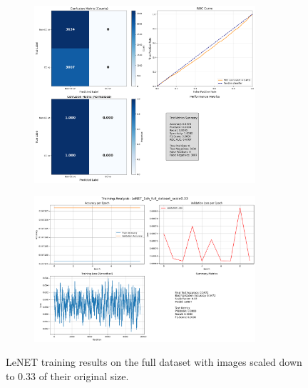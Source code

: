\documentclass{pracalicmgr}
\begin{document}
\begin{figure}[H]
    \centering
    \begin{subfigure}{\textwidth}
        \centering
        \includegraphics[width=0.9\textwidth]{src/LeNET_1ch_full_dataset_scale033.png}
        \label{fig:Lefull33sub1}
    \end{subfigure}
    
    \vspace{1cm}
    
    \begin{subfigure}{\textwidth}
        \centering
        \includegraphics[width=0.9\textwidth]{src/LeNET_1ch_full_dataset_scale033loss.png}
        \label{fig:Lefull33sub2}
    \end{subfigure}
    \caption{LeNET training results on the full dataset with images scaled down to 0.33 of their original size.}
    \label{fig:Lefull33stacked}
\end{figure}
\end{document}
